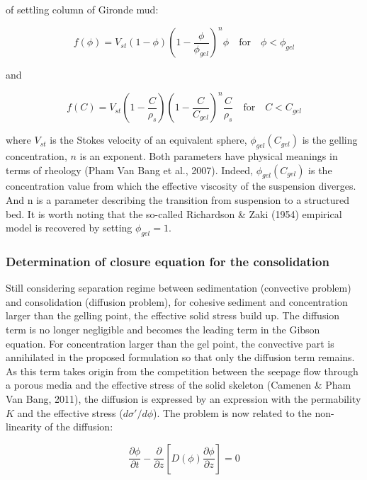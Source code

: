 of settling column of Gironde mud:

\begin{equation}\label{eq:16a}
f(\phi)=V_{st}(1-\phi)\left(1-\dfrac{\phi}{\phi_{gel}}\right)^n\phi
\quad \text{for}\quad \phi < \phi_{gel} 
\end{equation}

and

\begin{equation}\label{eq:16b}
f(C) = V_{st}(1-\dfrac{C}{\rho_s})\left(1-\dfrac{C}{C_{gel}} \right)^n\dfrac{C}{\rho_s}\quad\text{for}\quad C < C_{gel} 
\end{equation}

where $V_{st}$ is the Stokes velocity of an equivalent sphere, $\phi_{gel}(C_{gel})$ 
is the gelling concentration, $n$ is an exponent. Both parameters have physical meanings in terms of
rheology (Pham Van Bang et al., 2007). Indeed, $\phi_{gel}(C_{gel})$ is
the concentration value from which the effective viscosity of the suspension
diverges. And n is a parameter describing the transition from suspension to
a structured bed. It is worth noting that the so-called Richardson \& Zaki
(1954) empirical model is recovered by setting $\phi_{gel}=1$.

\subsubsection{Determination of closure equation for the consolidation}
Still considering separation regime between sedimentation (convective
problem) and consolidation (diffusion problem), for cohesive sediment and
concentration larger than the gelling point, the effective solid stress
build up. The diffusion term is no longer negligible and becomes the leading
term in the Gibson equation. For concentration larger than the gel point,
the convective part is annihilated in the proposed formulation so that only
the diffusion term remains. As this term takes origin from the competition
between the seepage flow through a porous media and the effective stress of
the solid skeleton (Camenen \& Pham Van Bang, 2011), the diffusion is
expressed by an expression with the permability $K$ and the effective stress ($d\sigma'/d\phi$). 
The problem is now related to the non-linearity of the diffusion:

\begin{equation}\label{eq:17}
\dfrac{\partial \phi }{\partial t} -\dfrac{\partial }{\partial z} \left[
D(\phi )\dfrac{\partial \phi }{\partial z} \right] =0 
\end{equation}%

